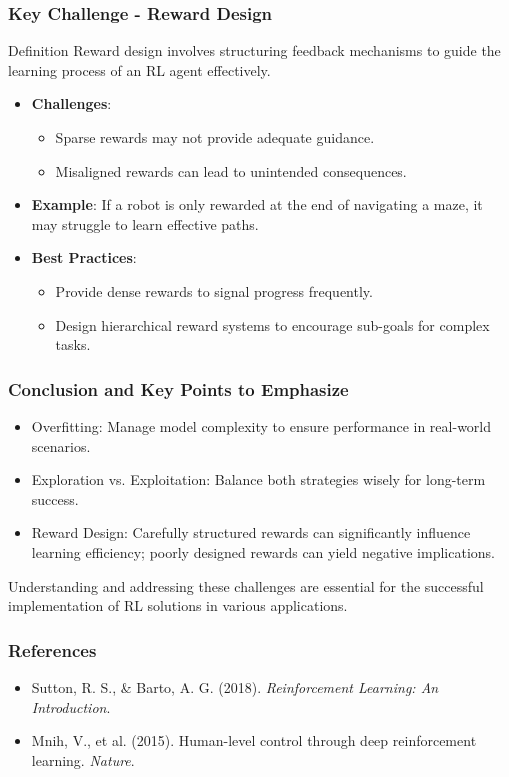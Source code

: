 \documentclass[aspectratio=169]{beamer}
\begin{document}
\begin{frame}[fragile]
    \frametitle{Key Challenge - Reward Design}
    \begin{block}{Definition}
        Reward design involves structuring feedback mechanisms to guide the learning process of an RL agent effectively.
    \end{block}
    \begin{itemize}
        \item \textbf{Challenges}:
        \begin{itemize}
            \item Sparse rewards may not provide adequate guidance.
            \item Misaligned rewards can lead to unintended consequences.
        \end{itemize}
        \item \textbf{Example}: If a robot is only rewarded at the end of navigating a maze, it may struggle to learn effective paths.
        \item \textbf{Best Practices}:
        \begin{itemize}
            \item Provide dense rewards to signal progress frequently.
            \item Design hierarchical reward systems to encourage sub-goals for complex tasks.
        \end{itemize}
    \end{itemize}
\end{frame}

\begin{frame}[fragile]
    \frametitle{Conclusion and Key Points to Emphasize}
    \begin{itemize}
        \item Overfitting: Manage model complexity to ensure performance in real-world scenarios.
        \item Exploration vs. Exploitation: Balance both strategies wisely for long-term success.
        \item Reward Design: Carefully structured rewards can significantly influence learning efficiency; poorly designed rewards can yield negative implications.
    \end{itemize}
    Understanding and addressing these challenges are essential for the successful implementation of RL solutions in various applications.
\end{frame}

\begin{frame}[fragile]
    \frametitle{References}
    \begin{itemize}
        \item Sutton, R. S., \& Barto, A. G. (2018). \textit{Reinforcement Learning: An Introduction}.
        \item Mnih, V., et al. (2015). Human-level control through deep reinforcement learning. \textit{Nature}.
    \end{itemize}
\end{frame}
\end{document}
